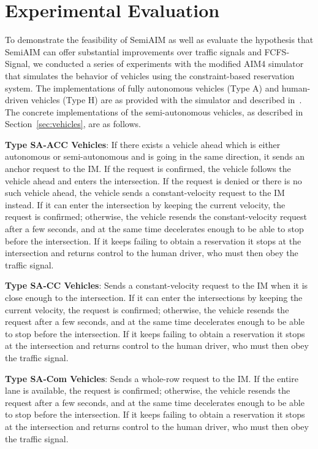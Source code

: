\section{Experimental Evaluation}
\label{sec:simulation}

To demonstrate the feasibility of SemiAIM as well as evaluate the
hypothesis that SemiAIM can offer substantial improvements over
traffic signals and FCFS-Signal, we conducted a series of experiments
with the modified AIM4 simulator that simulates the behavior of
vehicles using the constraint-based reservation system.  The
implementations of fully autonomous vehicles (Type A) and human-driven
vehicles (Type H) are as provided with the simulator and described
in~\cite{bib:Dresner08Multiagent}.  The concrete implementations of
the semi-autonomous vehicles, as described in
Section~\ref{sec:vehicles}, are as follows.

\begin{small_ind_s_itemize}

\item \textbf{Type SA-ACC Vehicles}: If there exists a vehicle ahead
which is either autonomous or semi-autonomous and is going in the same
direction, it sends an anchor request to the IM.  If the request is
confirmed, the vehicle follows the vehicle ahead and enters the
intersection.  If the request is denied or there is no such vehicle
ahead, the vehicle sends a constant-velocity request to the IM instead.
If it can enter the intersection
by keeping the current velocity, the request is confirmed; otherwise,
the vehicle resends the constant-velocity request after a few seconds,
and at the same time decelerates enough to be able to stop before the
intersection. If it keeps failing to obtain a reservation it stops at
the intersection and returns control to the human driver, who must
then obey the traffic signal.

\item \textbf{Type SA-CC Vehicles}:
Sends a constant-velocity request to the IM when it is close
enough to the intersection. If it can enter the intersections by
keeping the current velocity, the request is confirmed; otherwise, the
vehicle resends the request after a few seconds, and at the same time
decelerates enough to be able to stop before the intersection. 
If it keeps failing to obtain a reservation it stops at
the intersection and returns control to the human driver, who must
then obey the traffic signal.

\item \textbf{Type SA-Com Vehicles}:
Sends a whole-row request to the IM.  If the entire lane is
available, the request is confirmed; otherwise, the vehicle resends the
request after a few seconds, and at the same time decelerates enough to
be able to stop before the intersection. 
If it keeps failing to obtain a reservation it stops at
the intersection and returns control to the human driver, who must
then obey the traffic signal.
\end{small_ind_s_itemize}

